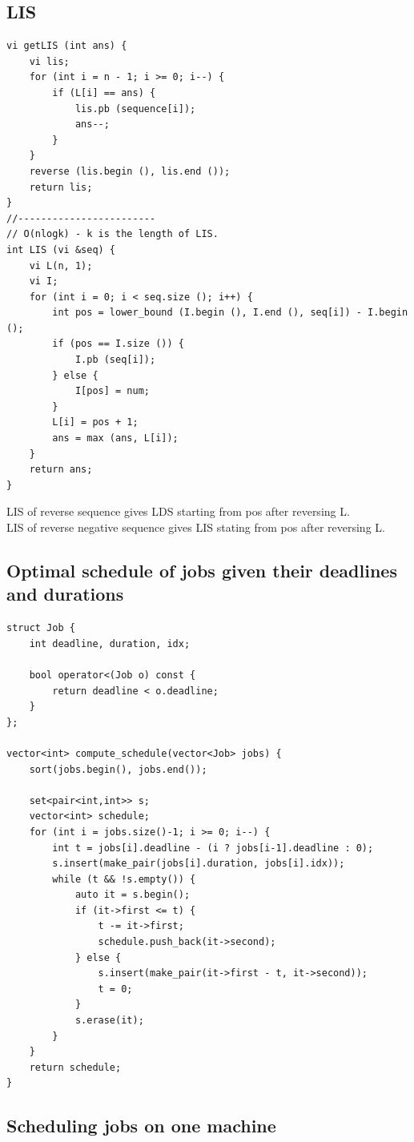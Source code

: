 \documentclass[8pt, a4paper, oneside, twocolumn]{extarticle}
\begin{document}
\subsection{LIS}
\begin{verbatim}
vi getLIS (int ans) {
    vi lis;
    for (int i = n - 1; i >= 0; i--) {
        if (L[i] == ans) {
            lis.pb (sequence[i]);
            ans--;
        }
    }
    reverse (lis.begin (), lis.end ());
    return lis;
}
//------------------------
// O(nlogk) - k is the length of LIS.
int LIS (vi &seq) {
    vi L(n, 1);
    vi I;
    for (int i = 0; i < seq.size (); i++) {
        int pos = lower_bound (I.begin (), I.end (), seq[i]) - I.begin ();
        if (pos == I.size ()) {
            I.pb (seq[i]);
        } else {
            I[pos] = num;
        }
        L[i] = pos + 1;
        ans = max (ans, L[i]);
    }
    return ans;
}
\end{verbatim}
LIS of reverse sequence gives LDS starting from pos after reversing L.\\
LIS of reverse negative sequence gives LIS stating from pos after reversing L.
\subsection{Optimal schedule of jobs given their deadlines and durations}
\begin{verbatim}
struct Job {
    int deadline, duration, idx;

    bool operator<(Job o) const {
        return deadline < o.deadline;
    }
};

vector<int> compute_schedule(vector<Job> jobs) {
    sort(jobs.begin(), jobs.end());

    set<pair<int,int>> s;
    vector<int> schedule;
    for (int i = jobs.size()-1; i >= 0; i--) {
        int t = jobs[i].deadline - (i ? jobs[i-1].deadline : 0);
        s.insert(make_pair(jobs[i].duration, jobs[i].idx));
        while (t && !s.empty()) {
            auto it = s.begin();
            if (it->first <= t) {
                t -= it->first;
                schedule.push_back(it->second);
            } else {
                s.insert(make_pair(it->first - t, it->second));
                t = 0;
            }
            s.erase(it);
        }
    }
    return schedule;
}
\end{verbatim}
\subsection{Scheduling jobs on one machine}
\end{document}
